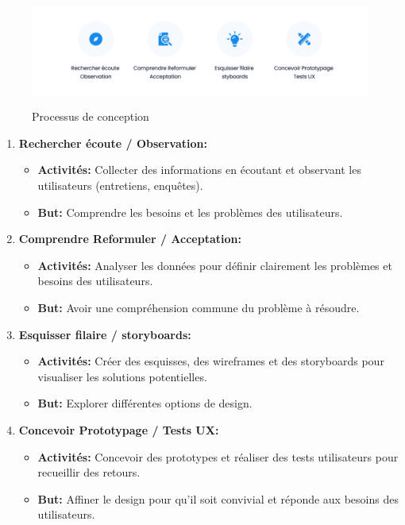 \documentclass[edit,12pt,a4paper,ChapStyle,oneside,doubleinterligne]{report}
\begin{document}
  \begin{figure} [H]
    \centering
    \includegraphics[width=13.335cm , height = 3.59cm , angle=360]{images/processe.png}
    \caption{Processus de conception}
    \label{fig:processe}
\end{figure}
\begin{enumerate}
    \item \textbf{Rechercher écoute / Observation:} \begin{itemize}
        \item \textbf{Activités: }Collecter des informations en écoutant et observant les utilisateurs (entretiens, enquêtes).
        \item \textbf{But: }Comprendre les besoins et les problèmes des utilisateurs.
    \end{itemize}
    \item \textbf{Comprendre Reformuler / Acceptation:} \begin{itemize}
        \item \textbf{Activités: }Analyser les données pour définir clairement les problèmes et besoins des utilisateurs.
        \item \textbf{But: }Avoir une compréhension commune du problème à résoudre.
    \end{itemize}
    \item \textbf{Esquisser filaire / storyboards:} \begin{itemize}
        \item \textbf{Activités: }Créer des esquisses, des wireframes et des storyboards pour visualiser les solutions potentielles.
        \item \textbf{But: }Explorer différentes options de design.
    \end{itemize}
    \item \textbf{Concevoir Prototypage / Tests UX:} \begin{itemize}
        \item \textbf{Activités: }Concevoir des prototypes et réaliser des tests utilisateurs pour recueillir des retours.
        \item \textbf{But: }Affiner le design pour qu’il soit convivial et réponde aux besoins des utilisateurs.
    \end{itemize}
\end{enumerate}
\end{document}
